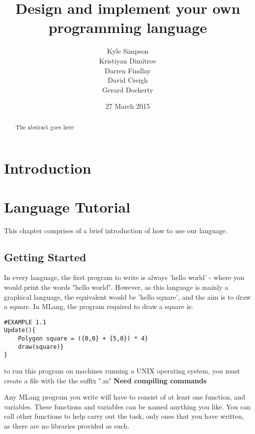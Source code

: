\documentclass{l3proj}
\begin{document}
\title{Design and implement your own programming language}
\author{Kyle Simpson\\
		Kristiyan Dimitrov\\
        Darren Findlay\\
        David Creigh\\
		Gerard Docherty}
\date{27 March 2015}
\maketitle
\begin{abstract}

The abstract goes here

\end{abstract}
\educationalconsent
\tableofcontents
\chapter{Introduction}
\label{intro}


\chapter{Language Tutorial}
\label{tut}
This chapter comprises of a brief introduction of how to use our language.
\section{Getting Started}
In every language, the first program to write is always 'hello world' - where you would print the words "hello world". However, as this language is mainly a graphical language, the equivalent would be 'hello square', and the aim is to draw a square. In MLang, the program required to draw a square is:\\
\begin{lstlisting}
#EXAMPLE 1.1
Update(){
	Polygon square = ({0,0} + {5,0}) * 4}
	draw(square)}
}
\end{lstlisting}
to run this program on machines running a UNIX operating system, you must create a file with the the suffix ".m"
\textbf{Need compiling commands}

Any MLang program you write will have to consist of at least one function, and variables. These functions and variables can be named anything you like. You can call other functions to help carry out the task, only ones that you have written, as there are no libraries provided as such. 
\end{document}
